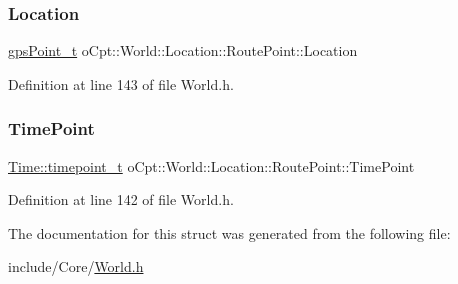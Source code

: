 \subsubsection{\texorpdfstring{Location}{Location}}
{\footnotesize\ttfamily \hyperlink{classo_cpt_1_1_world_1_1_location_a3aa5e31e2888b4da40ad534b99473888}{gps\+Point\+\_\+t} o\+Cpt\+::\+World\+::\+Location\+::\+Route\+Point\+::\+Location}



Definition at line 143 of file World.\+h.

\hypertarget{structo_cpt_1_1_world_1_1_location_1_1_route_point_ab1843ea5bc2555a1258f15578198fb3d}{}\label{structo_cpt_1_1_world_1_1_location_1_1_route_point_ab1843ea5bc2555a1258f15578198fb3d} 
\subsubsection{\texorpdfstring{Time\+Point}{TimePoint}}
{\footnotesize\ttfamily \hyperlink{classo_cpt_1_1_world_1_1_time_a6a6e782c3c90622c1c7070b0a223ec4c}{Time\+::timepoint\+\_\+t} o\+Cpt\+::\+World\+::\+Location\+::\+Route\+Point\+::\+Time\+Point}



Definition at line 142 of file World.\+h.



The documentation for this struct was generated from the following file\+:\begin{DoxyCompactItemize}
\item 
include/\+Core/\hyperlink{_world_8h}{World.\+h}\end{DoxyCompactItemize}
